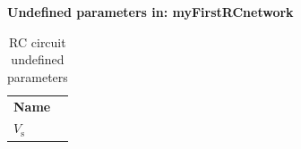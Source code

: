 {\textbf{Undefined parameters in: myFirstRCnetwork}}

\begin{table}[h]
\centering
\begin{tabular}[c]{l}
\textbf{Name} \\ 
\rowcolor{myyellow}
$V_{\mathrm{s}}$ \\ 
\end{tabular}
\caption{RC circuit undefined parameters}
\end{table}

